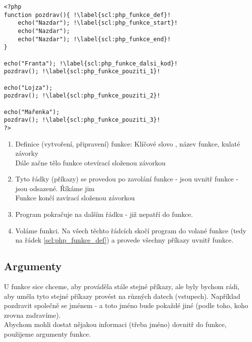 \begin{minipage}[t]{.45\textwidth}
\begin{code}
\begin{verbatim}
<?php
function pozdrav(){	!\label{scl:php_funkce_def}!
	echo("Nazdar"); !\label{scl:php_funkce_start}!
	echo("Nazdar");
	echo("Nazdar"); !\label{scl:php_funkce_end}!
}	

echo("Franta"); !\label{scl:php_funkce_dalsi_kod}!
pozdrav(); !\label{scl:php_funkce_pouziti_1}!

echo("Lojza");
pozdrav(); !\label{scl:php_funkce_pouziti_2}!

echo("Mařenka");
pozdrav(); !\label{scl:php_funkce_pouziti_3}!
?>
\end{verbatim}

\label{code:php_funkce_definice}
\end{code}
\end{minipage}
\begin{minipage}[t]{.45\textwidth}
\begin{enumerate}
\item[ř. \ref{scl:php_funkce_def}:] Definice (vytvoření, připravení) funkce: Klíčové slovo , název funkce, kulaté závorky\\
Dále začne tělo funkce otevírací složenou závorkou
\item[ř. \ref{scl:php_funkce_start}-\ref{scl:php_funkce_end}:] Tyto řádky (příkazy) se provedou po zavolání funkce - jsou uvnitř funkce - jsou odsazené. Říkáme jim \\
Funkce končí zavírací složenou závorkou
\item[ř. \ref{scl:php_funkce_dalsi_kod}:] Program pokračuje na dalším řádku - již nepatří do funkce.
\item[ř. \ref{scl:php_funkce_pouziti_1}, \ref{scl:php_funkce_pouziti_2}, \ref{scl:php_funkce_pouziti_3}:] Voláme funkci. Na všech těchto řádcích skočí program do volané funkce (tedy na řádek \ref{scl:php_funkce_def}) a provede všechny příkazy uvnitř funkce.
\end{enumerate}
\end{minipage}


\subsection{Argumenty}
U funkce sice chceme, aby prováděla stále stejné příkazy, ale byly bychom rádi, aby uměla tyto stejné příkazy provést na různých datech (vstupech). Například pozdravit společně se jménem - a toto jméno bude pokaždé jiné (podle toho, koho zrovna zadravíme).\\
Abychom mohli dostat nějakou informaci (třeba jméno) dovnitř do funkce, použijeme argumenty funkce.\\

